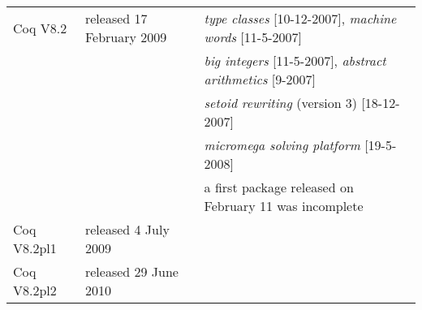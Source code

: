 \documentclass[a4paper]{book}
\newcommand{\feature}[1]{{\em #1}}
\begin{document}
\begin{tabular}{l|l|l}
Coq V8.2 & released 17 February 2009 & \feature{type classes} [10-12-2007], \feature{machine words} [11-5-2007]\\
  & & \feature{big integers} [11-5-2007], \feature{abstract arithmetics} [9-2007]\\
  & & \feature{setoid rewriting} (version 3) [18-12-2007] \\
  & & \feature{micromega solving platform} [19-5-2008]\\

& & a first package released on
February 11 was incomplete\\
Coq V8.2pl1& released 4 July 2009 & \\
Coq V8.2pl2& released 29 June 2010 & \\
\end{tabular}

\medskip
\bigskip
\end{document}
